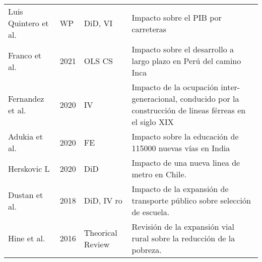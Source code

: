 \documentclass[20pt,margin=1in,innermargin=-4.5in,blockverticalspace=-0.25in]{tikzposter}
\begin{document}
\begin{columns}
{\begin{center}
\begin{tabular}{lllp{14cm}}
            Luis Quintero et al. & WP &DiD, VI &   Impacto sobre el PIB por carreteras \\
            Franco et al.  & 2021 & OLS CS &   Impacto sobre el desarrollo a largo plazo en Perú del camino Inca \\
            Fernandez et al. & 2020 & IV &   Impacto de la ocupación inter-generacional, conducido por la construcción de lineas férreas en el siglo XIX  \\
            Adukia et al.  & 2020   &    FE    & Impacto sobre la educación de 115000 nuevas vías en India         \\
            Herskovic L   & 2020   &     DiD  & Impacto de una nueva linea de metro en Chile.   \\
            Dustan et al.  &  2018   &  DiD, IV ro &  Impacto de la expansión de transporte público sobre selección de escuela. \\
            Hine et al.  &  2016   &  Theorical Review &  Revisión de la expansión vial rural sobre la reducción de la pobreza. \\

            \cline{1-4}
        \end{tabular}
    \end{center}
    }
\end{columns}
\end{document}
